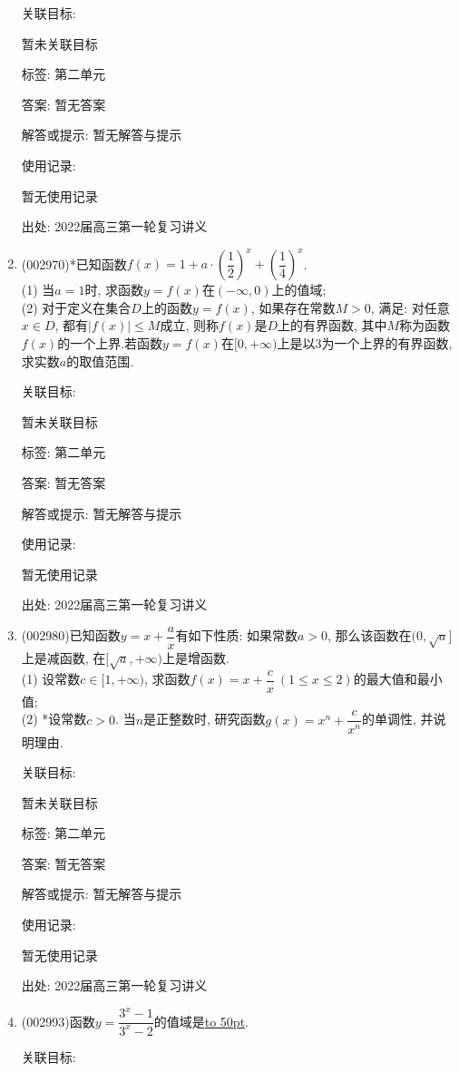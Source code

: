 \documentclass[10pt,a4paper]{article}
\newcommand{\blank}[1]{\underline{\hbox to #1pt{}}}
\begin{document}
\begin{enumerate}[1.]
关联目标:

暂未关联目标



标签: 第二单元

答案: 暂无答案

解答或提示: 暂无解答与提示

使用记录:

暂无使用记录


出处: 2022届高三第一轮复习讲义
\item { (002970)}*已知函数$f(x)=1+a\cdot (\dfrac 12)^x+(\dfrac 14)^x$.\\
(1) 当$a=1$时, 求函数$y=f(x)$在$(-\infty,0)$上的值域;\\
(2) 对于定义在集合$D$上的函数$y=f(x)$, 如果存在常数$M>0$, 满足: 对任意$x\in D$, 都有$|f(x)|\le M$成立, 则称$f(x)$是$D$上的有界函数, 其中$M$称为函数$f(x)$的一个上界.若函数$y=f(x)$在$[0,+\infty)$上是以$3$为一个上界的有界函数, 求实数$a$的取值范围.


关联目标:

暂未关联目标



标签: 第二单元

答案: 暂无答案

解答或提示: 暂无解答与提示

使用记录:

暂无使用记录


出处: 2022届高三第一轮复习讲义
\item { (002980)}已知函数$y=x+\dfrac ax$有如下性质: 如果常数$a>0$, 那么该函数在$(0, \sqrt a]$上是减函数, 在$[\sqrt a, +\infty)$上是增函数.\\
(1) 设常数$c\in [1,+\infty)$, 求函数$f(x)=x+\dfrac cx \ (1\le x\le 2)$的最大值和最小值;\\
(2) *设常数$c>0$. 当$n$是正整数时, 研究函数$g(x)=x^n+\dfrac c{x^n}$的单调性, 并说明理由.


关联目标:

暂未关联目标



标签: 第二单元

答案: 暂无答案

解答或提示: 暂无解答与提示

使用记录:

暂无使用记录


出处: 2022届高三第一轮复习讲义
\item { (002993)}函数$y=\dfrac{3^x-1}{3^x-2}$的值域是\blank{50}.


关联目标:


\end{enumerate}
\end{document}
